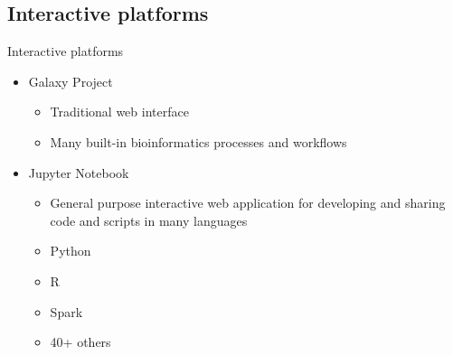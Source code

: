 \documentclass[xcolor=x11names,compress]{beamer}
\makeatletter
\newcommand{\darkcolors}{
\setbeamercolor*{normal text}{fg=white, bg=black} 
\setbeamercolor*{example text}{fg=white} 
\setbeamercolor*{structure}{fg=sangerlightblue2}  
\setbeamercolor*{frametitle}{fg=sangerlightblue2}  
\setbeamercolor*{itemize/enumerate body}{fg=white}
\setbeamercolor*{itemize/enumerate subbody}{fg=white}
}
\renewcommand{\(}{\begin{columns}}
\renewcommand{\)}{\end{columns}}
\newcommand{\<}[1]{\begin{column}{#1}}
\renewcommand{\>}{\end{column}}
\newenvironment{backgroundblock}[2]{%
  \global\setbox\@backgroundblock=\vbox\bgroup%
    \unvbox\@backgroundblock%
    \vbox to0pt\bgroup\vskip#2\hbox to0pt\bgroup\hskip#1\relax%
}{\egroup\egroup\egroup}
\makeatother
\begin{document}
\subsection*{Interactive platforms}
\begin{frame}{Interactive platforms}
\pipesbackground
{}
\begin{itemize}
	\item Galaxy Project
	\begin{itemize}
	\item Traditional web interface
	\item Many built-in bioinformatics processes and workflows
	\end{itemize}
	\item Jupyter Notebook
	\begin{itemize}
	\item General purpose interactive web application for developing and sharing code and scripts in many languages
	\item Python
	\item R
	\item Spark
	\item 40+ others
	\end{itemize}
\end{itemize}
\end{frame}



\end{document}
